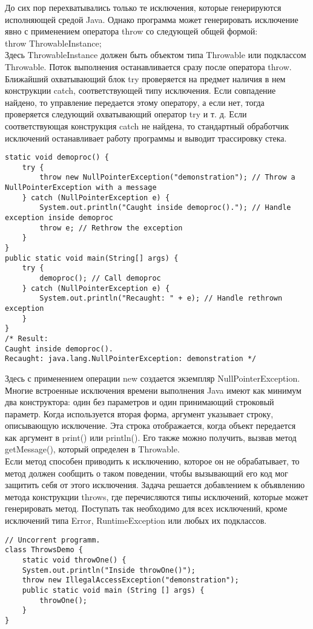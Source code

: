 До сих пор перехватывались только те исключения, которые генерируются исполняющей средой Java. Однако программа может генерировать исключение явно с применением оператора throw со следующей общей формой: \\
throw ThrowableInstance; \\
Здесь ThrowableInstance должен быть объектом типа Throwable или
подклассом Throwable. Поток выполнения останавливается сразу после оператора throw. Ближайший охватывающий блок try проверяется на предмет наличия в нем конструкции catch, соответствующей типу исключения. Если совпадение найдено, то управление передается этому оператору, а если нет, тогда проверяется следующий охватывающий оператор try и т. д. Если соответствующая конструкция catch не найдена, то стандартный обработчик исключений останавливает работу программы и выводит трассировку стека. 
\begin{lstlisting}
static void demoproc() {
    try {
        throw new NullPointerException("demonstration"); // Throw a NullPointerException with a message
    } catch (NullPointerException e) {
        System.out.println("Caught inside demoproc()."); // Handle exception inside demoproc
        throw e; // Rethrow the exception
    }
}
public static void main(String[] args) {
    try {
        demoproc(); // Call demoproc
    } catch (NullPointerException e) {
        System.out.println("Recaught: " + e); // Handle rethrown exception
    }
}
/* Result:
Caught inside demoproc().
Recaught: java.lang.NullPointerException: demonstration */
\end{lstlisting}
Здесь с применением операции new создается экземпляр NullPointerException. Многие встроенные исключения времени выполнения Java имеют как минимум два конструктора: один без параметров и один принимающий строковый параметр. Когда используется вторая форма, аргумент указывает строку, описывающую исключение. Эта строка отображается, когда объект передается как аргумент в print() или println(). Его также можно получить, вызвав метод getMessage(), который определен в Throwable. \\
Если метод способен приводить к исключению, которое он не обрабатывает, то метод должен сообщить о таком поведении, чтобы вызывающий его код мог защитить себя от этого исключения. Задача решается добавлением к объявлению метода конструкции throws, где перечисляются типы исключений, которые может генерировать метод. Поступать так необходимо для всех исключений, кроме исключений типа Error, RuntimeException или любых их подклассов.
\begin{lstlisting}
// Uncorrent programm.
class ThrowsDemo {
    static void throwOne() {
    System.out.println("Inside throwOne()");
    throw new IllegalAccessException("demonstration");
    public static void main (String [] args) {
        throwOne();
    }
}
\end{lstlisting}
